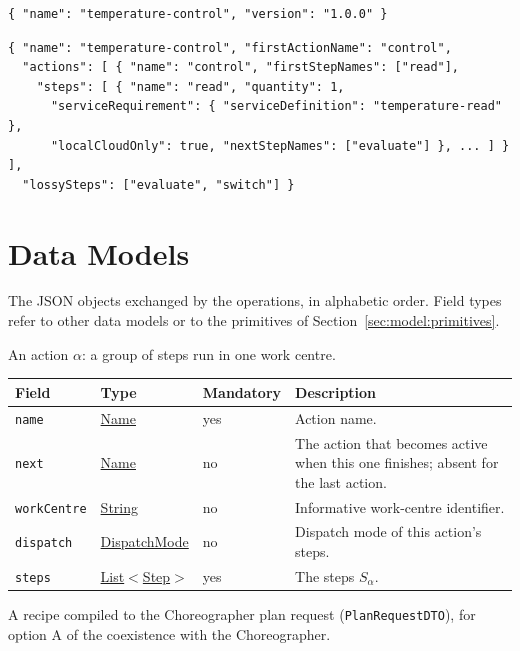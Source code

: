 \documentclass[a4paper]{arrowhead}
\newcommand{\mref}[1]{{\textcolor{ArrowheadPurple}{\hyperref[sec:model:#1]{#1}}}}
\newcommand{\pref}[1]{{\textcolor{ArrowheadGrey}{\hyperref[sec:model:primitives:#1]{#1}}}}
\begin{document}
\begin{lstlisting}[caption={Example request body}]
{ "name": "temperature-control", "version": "1.0.0" }
\end{lstlisting}


\begin{lstlisting}[caption={Example response body}]
{ "name": "temperature-control", "firstActionName": "control",
  "actions": [ { "name": "control", "firstStepNames": ["read"],
    "steps": [ { "name": "read", "quantity": 1,
      "serviceRequirement": { "serviceDefinition": "temperature-read" },
      "localCloudOnly": true, "nextStepNames": ["evaluate"] }, ... ] } ],
  "lossySteps": ["evaluate", "switch"] }
\end{lstlisting}


\newpage
\section{Data Models}
\label{sec:model}
The JSON objects exchanged by the operations, in alphabetic order. Field types refer to other data models or to the
primitives of Section~\ref{sec:model:primitives}.

An action $\alpha$: a group of steps run in one work centre.

{\small
\begin{longtable}{|p{3.7cm}|p{4.2cm}|p{1.6cm}|p{6.3cm}|}

\hline
\rowcolor{gray!33} Field & Type & Mandatory & Description \\ \hline
\endhead
\texttt{name} & \pref{Name} & yes & Action name. \\ \hline
\texttt{next} & \pref{Name} & no & The action that becomes active when this one finishes; absent for the last action. \\ \hline
\texttt{workCentre} & \pref{String} & no & Informative work-centre identifier. \\ \hline
\texttt{dispatch} & \mref{DispatchMode} & no & Dispatch mode of this action's steps. \\ \hline
\texttt{steps} & \pref{List}$<$\mref{Step}$>$ & yes & The steps $S_\alpha$. \\ \hline
\end{longtable}
}

A recipe compiled to the Choreographer plan request (\texttt{Plan\allowbreak{}RequestDTO}), for option A of the coexistence with the Choreographer.
\end{document}
